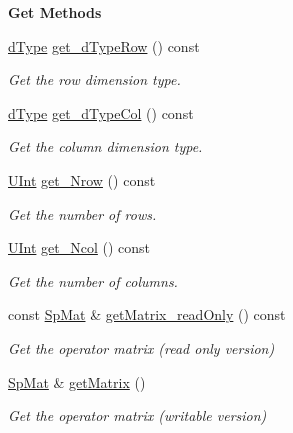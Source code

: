 \begin{Indent}{\bf Get Methods}\par
\begin{DoxyCompactItemize}
\item 
\hyperlink{classFVCode3D_1_1global__Operator_a9e94fbe56b84ba80f9e9be56c808e5c3}{d\+Type} \hyperlink{classFVCode3D_1_1global__Operator_a8a5c0eb783ea26ca68347df9abff1382}{get\+\_\+d\+Type\+Row} () const 
\begin{DoxyCompactList}\small\item\em Get the row dimension type. \end{DoxyCompactList}\item 
\hyperlink{classFVCode3D_1_1global__Operator_a9e94fbe56b84ba80f9e9be56c808e5c3}{d\+Type} \hyperlink{classFVCode3D_1_1global__Operator_aee57675a48c5d7cf2466b5eac2cc70de}{get\+\_\+d\+Type\+Col} () const 
\begin{DoxyCompactList}\small\item\em Get the column dimension type. \end{DoxyCompactList}\item 
\hyperlink{namespaceFVCode3D_a4bf7e328c75d0fd504050d040ebe9eda}{U\+Int} \hyperlink{classFVCode3D_1_1global__Operator_afbd8b1757f3210ca8891df24c0d37403}{get\+\_\+\+Nrow} () const 
\begin{DoxyCompactList}\small\item\em Get the number of rows. \end{DoxyCompactList}\item 
\hyperlink{namespaceFVCode3D_a4bf7e328c75d0fd504050d040ebe9eda}{U\+Int} \hyperlink{classFVCode3D_1_1global__Operator_a76a78df7b59729b7a9b24ba4ddb04d72}{get\+\_\+\+Ncol} () const 
\begin{DoxyCompactList}\small\item\em Get the number of columns. \end{DoxyCompactList}\item 
const \hyperlink{namespaceFVCode3D_ac1032289d96638cf0ad6c52ef639095f}{Sp\+Mat} \& \hyperlink{classFVCode3D_1_1global__Operator_a99fea342f26142e11b629a97389eb758}{get\+Matrix\+\_\+read\+Only} () const 
\begin{DoxyCompactList}\small\item\em Get the operator matrix (read only version) \end{DoxyCompactList}\item 
\hyperlink{namespaceFVCode3D_ac1032289d96638cf0ad6c52ef639095f}{Sp\+Mat} \& \hyperlink{classFVCode3D_1_1global__Operator_a2a7964a054efe6cea557fcd92ba34d6c}{get\+Matrix} ()
\begin{DoxyCompactList}\small\item\em Get the operator matrix (writable version) \end{DoxyCompactList}\end{DoxyCompactItemize}
\end{Indent}
